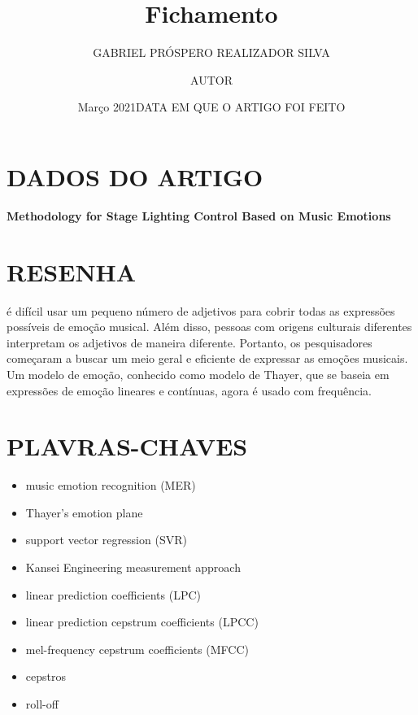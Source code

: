 \documentclass{article}
\title{Fichamento}
\author{GABRIEL PRÓSPERO REALIZADOR  SILVA}
\date{Março 2021}
\begin{document}
\maketitle

\section{DADOS DO ARTIGO}
\textbf{Methodology for Stage Lighting Control Based on Music Emotions \\}
\author{AUTOR \\}
\date{DATA EM QUE O ARTIGO FOI FEITO}

\section{RESENHA}
é difícil usar um pequeno número de adjetivos para cobrir todas as expressões possíveis de emoção musical. Além disso, pessoas com origens culturais diferentes interpretam os adjetivos de maneira diferente. Portanto, os pesquisadores começaram a buscar um meio geral e eficiente de expressar as emoções musicais. Um modelo de emoção, conhecido como modelo de Thayer, que se baseia em expressões de emoção lineares e contínuas, agora é usado com frequência.


\section{PLAVRAS-CHAVES}
\begin{itemize}
    \item music emotion recognition (MER)
    \item Thayer’s emotion plane
    \item support vector regression (SVR)
    \item Kansei Engineering measurement approach
    \item linear prediction coefficients (LPC)
    \item linear prediction cepstrum coefficients (LPCC)
    \item mel-frequency cepstrum coefficients (MFCC)
    \item cepstros
    \item roll-off
\end{itemize}
\end{document}
